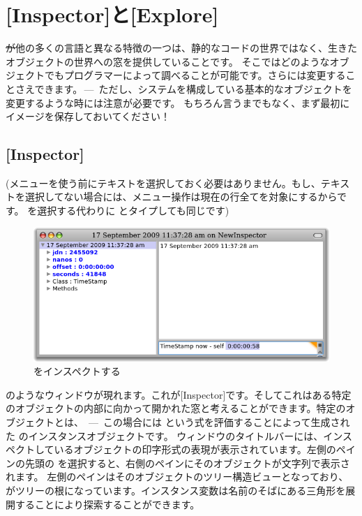 \documentclass[a4paper,10pt,twoside]{book}
\begin{document}
\section{[Inspector]と[Explore]}

\st が他の多くの言語と異なる特徴の一つは、静的なコードの世界ではなく、生きたオブジェクトの世界への窓を提供していることです。
そこではどのようなオブジェクトでもプログラマーによって調べることが可能です。さらには変更することさえできます。\,---\, ただし、システムを構成している基本的なオブジェクトを変更するような時には注意が必要です。
もちろん言うまでもなく、まず最初にイメージを保存しておいてください！

\subsection{[Inspector]}

(メニューを使う前にテキストを選択しておく必要はありません。もし、テキストを選択してない場合には、メニュー操作は現在の行全てを対象にするからです。  を選択する代わりに  とタイプしても同じです)


\begin{figure}[btp]
	\begin{center}
		\includegraphics[width=\textwidth]{inspectTimeNow1}
	\end{center}
	\caption{  をインスペクトする}
\end{figure}

 のようなウィンドウが現れます。これが[Inspector]です。そしてこれはある特定のオブジェクトの内部に向かって開かれた窓と考えることができます。特定のオブジェクトとは、 \,---\, この場合には   という式を評価することによって生成された  \mbox{} のインスタンスオブジェクトです。
ウィンドウのタイトルバーには、インスペクトしているオブジェクトの印字形式の表現が表示されています。左側のペインの先頭の  を選択すると、右側のペインにそのオブジェクトが文字列で表示されます。
左側のペインはそのオブジェクトのツリー構造ビューとなっており、\self がツリーの根になっています。インスタンス変数は名前のそばにある三角形を展開することにより探索することができます。
\end{document}
